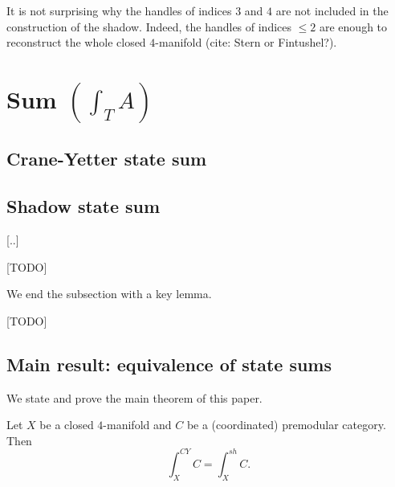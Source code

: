 \begin{remark}
  It is not surprising why the handles of indices $3$ and $4$ are
  not included in the construction of the shadow. Indeed, the
  handles of indices $\leq 2$ are enough to reconstruct the whole
  closed $4$-manifold (cite: Stern or Fintushel?).
\end{remark}

\section{Sum $\left( \int_{T}{A} \right)$}
\subsection{Crane-Yetter state sum}

\subsection{Shadow state sum}

[..]

\begin{proposition}\label{prop/shadow-state-sum-is-local}
  [TODO]
\end{proposition}

We end the subsection with a key lemma.

\begin{lemma}\label{lemma/10j-symbol-as-shadow-state-sum}
  [TODO]
\end{lemma}

\subsection{Main result: equivalence of state sums}

\noindent We state and prove the main theorem of this paper.

\begin{theorem}
  Let $X$ be a closed $4$-manifold and $C$ be a (coordinated)
  premodular category. Then $$\int^{CY}_{X}C = \int^{sh}_{X} C.$$
\end{theorem}


